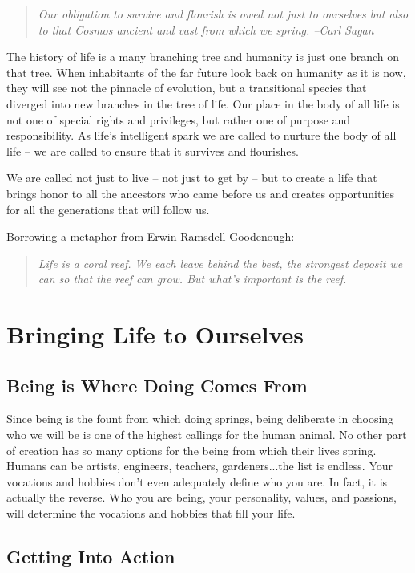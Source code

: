 \documentclass[ebook,12pt,openany,twoside]{memoir}
\begin{document}
\begin{quote}
\em
Our obligation to survive and flourish is owed not just to ourselves but also
to that Cosmos ancient and vast from which we spring. --Carl Sagan
\end{quote}

The history of life is a many branching tree and humanity is just one branch on
that tree. When inhabitants of the far future look back on humanity as it is
now, they will see not the pinnacle of evolution, but a transitional species
that diverged into new branches in the tree of life. Our place in the body of
all life is not one of special rights and privileges, but rather one of purpose
and responsibility. As life's intelligent spark we are called to nurture the
body of all life -- we are called to ensure that it survives and flourishes.

We are called not just to live -- not just to get by -- but to create a life
that brings honor to all the ancestors who came before us and creates
opportunities for all the generations that will follow us.

Borrowing a metaphor from Erwin Ramsdell Goodenough:

\begin{quote}
	\em Life is a coral reef. We each leave behind the best, the strongest
	deposit we can so that the reef can grow. But what's important is the
	reef.
\end{quote}


\part{Bringing Life to Ourselves}

\chapter{Being is Where Doing Comes From}

Since being is the fount from which doing springs, being deliberate in choosing
who we will be is one of the highest callings for the human animal. No other
part of creation has so many options for the being from which their lives
spring. Humans can be artists, engineers, teachers, gardeners...the list is
endless. Your vocations and hobbies don't even adequately define who you are.
In fact, it is actually the reverse. Who you are being, your personality,
values, and passions, will determine the vocations and hobbies that fill your
life.

\chapter{Getting Into Action}
\end{document}
